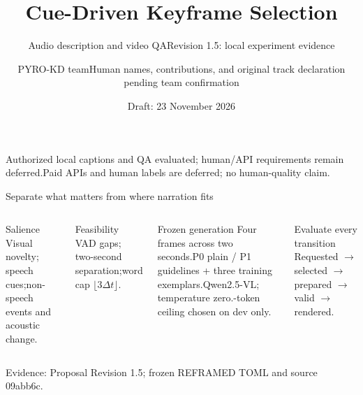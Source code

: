 \documentclass[aspectratio=169,11pt]{beamer}
\title{Cue-Driven Keyframe Selection}
\subtitle{Audio description and video QA\newline Revision 1.5: local experiment evidence}
\author{PYRO-KD team\newline\small Human names, contributions, and original track declaration pending team confirmation}
\institute{NYU Computer Vision \textbullet\ Agent Track research project}
\date{Draft: 23 November 2026}
\newcommand{\source}[1]{\vfill{\tiny\color{gray}Evidence: #1}}
\begin{document}
\begin{frame}
\titlepage
\vspace{-4mm}
\begin{center}\small Authorized local captions and QA evaluated; human/API requirements remain deferred.\newline Paid APIs and human labels are deferred; no human-quality claim.\end{center}
\end{frame}

\begin{frame}{Separate what matters from where narration fits}
\begin{columns}[T]
\begin{block}{Salience}
Visual novelty; speech cues;\newline non-speech events and acoustic change.
\end{block}
\begin{block}{Feasibility}
VAD gaps; two-second separation;\newline word cap $\lfloor3\Delta t\rfloor$.
\end{block}
\begin{block}{Frozen generation}
Four frames across two seconds.\newline P0 plain / P1 guidelines + three training exemplars.\newline Qwen2.5-VL; temperature zero.-token ceiling chosen on dev only.
\end{block}
\begin{alertblock}{Evaluate every transition}
Requested $\rightarrow$ selected $\rightarrow$ prepared $\rightarrow$ valid $\rightarrow$ rendered.
\end{alertblock}
\end{columns}
\source{Proposal Revision 1.5; frozen REFRAMED TOML and source 09abb6c.}
\end{frame}
\end{document}
